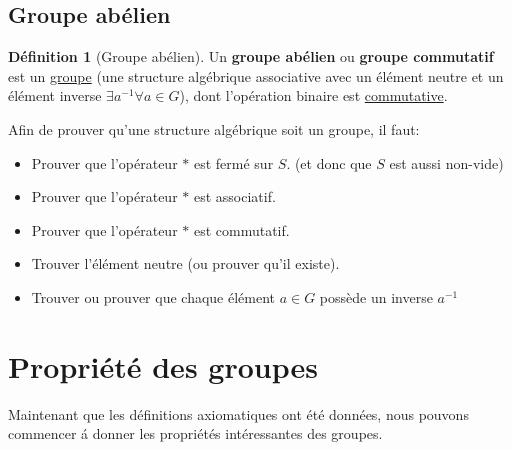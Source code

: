 \documentclass[12pt]{book}
\theoremstyle{definition}
\newtheorem{definition}{Définition}[section]
\begin{document}
\section{Groupe abélien}
\begin{definition}[Groupe abélien]
    \label{def:groupe_abelien}
    Un \textbf{groupe abélien} ou \textbf{groupe commutatif} est un \hyperref[def:groupe]{groupe} 
    (une structure algébrique associative avec un élément neutre et un élément inverse $\exists a^{-1} \forall a \in G$), 
    dont l'opération binaire est \hyperref[def:commutativite]{commutative}.
\end{definition}
Afin de prouver qu'une structure algébrique soit un groupe, il faut:
\begin{itemize}
    \item Prouver que l'opérateur $\ast$ est fermé sur $S$. (et donc que $S$ est aussi non-vide)
    \item Prouver que l'opérateur $\ast$ est associatif.
    \item Prouver que l'opérateur $\ast$ est commutatif.
    \item Trouver l'élément neutre (ou prouver qu'il existe).
    \item Trouver ou prouver que chaque élément $a \in G$ possède un inverse $a^{-1}$
\end{itemize}


\chapter{Propriété des groupes}
Maintenant que les définitions axiomatiques ont été données, nous pouvons commencer á donner les propriétés intéressantes
des groupes.
\end{document}
